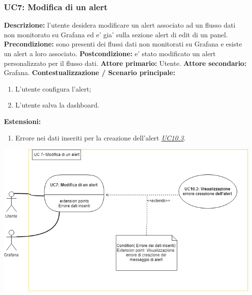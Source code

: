                 \subsubsection{UC7: Modifica di un alert}
                    \textbf{Descrizione:} l’utente desidera modificare un alert associato ad un flusso dati non monitorato su Grafana ed e’ gia’ sulla sezione alert di edit di un panel.
                    \newline
                    \textbf{Precondizione:} sono presenti dei flussi dati non monitorati su Grafana e esiste un alert a loro associato.
                    \newline
                    \textbf{Postcondizione:} e’ stato modificato un alert personalizzato per il flusso dati.
                    \newline
                    \textbf{Attore primario:} Utente.
                    \newline
                    \textbf{Attore secondario:} Grafana.
                    \newline
                    \textbf{Contestualizzazione / Scenario principale:} \begin{enumerate}
                            \item L’utente configura l’alert;
                            \item L’utente salva la dashboard.
                        \end{enumerate}
                    
                    \textbf{Estensioni:} 
                    \begin{enumerate}
                            \item Errore nei dati inseriti per la creazione dell'alert \underline{\textit{UC10.3}}.
                        \end{enumerate}
                        
                \includegraphics[width=\textwidth]{UC7.png}
                        
